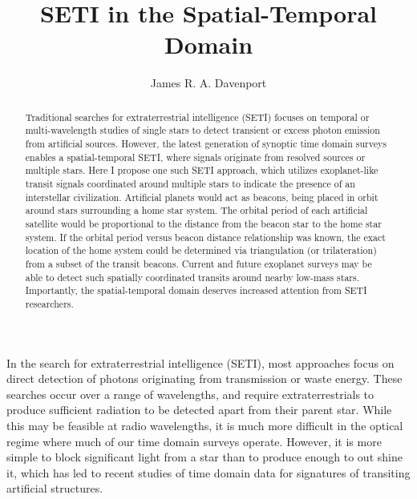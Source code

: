 \documentclass[manuscript, letterpaper]{aastex6}
\makeatletter
\let\origsection\section
\renewcommand\section{\@ifstar{\starsection}{\nostarsection}}
\newcommand\nostarsection[1]{\sectionprelude\origsection{#1}}
\newcommand\starsection[1]{\sectionprelude\origsection*{#1}}
\newcommand\sectionprelude{\vspace{1em}}
\makeatother
\begin{document}
\title{SETI in the Spatial-Temporal Domain}


\author{
	James R. A. Davenport
	}

 

\begin{abstract}
Traditional searches for extraterrestrial intelligence (SETI) focuses on temporal or multi-wavelength studies of single stars to detect transient or excess photon emission from artificial sources. However, the latest generation of synoptic time domain surveys enables a spatial-temporal SETI, where signals originate from resolved sources or multiple stars. Here I propose one such SETI approach, which utilizes exoplanet-like transit signals coordinated around multiple stars to indicate the presence of an interstellar civilization. Artificial planets would act as beacons, being placed in orbit around stars surrounding a home star system. The orbital period of each artificial satellite would be proportional to the distance from the beacon star to the home star system. If the orbital period versus beacon distance relationship was known, the exact location of the home system could be determined via triangulation (or trilateration) from a subset of the transit beacons. Current and future exoplanet surveys may be able to detect such spatially coordinated transits around nearby low-mass stars. Importantly, the spatial-temporal domain deserves increased attention from SETI researchers.
\end{abstract}


\section{Introduction}

In the search for extraterrestrial intelligence (SETI), most approaches focus on direct detection of photons originating from transmission or waste energy. These searches occur over a range of wavelengths, and require extraterrestrials to produce sufficient radiation to be detected apart from their parent star. While this may be feasible at radio wavelengths, it is much more difficult in the optical regime where much of our time domain surveys operate. However,  it is more simple to block significant light from a star than to produce enough to out shine it, which has led to recent studies of time domain data for signatures of transiting artificial structures. 
\end{document}
